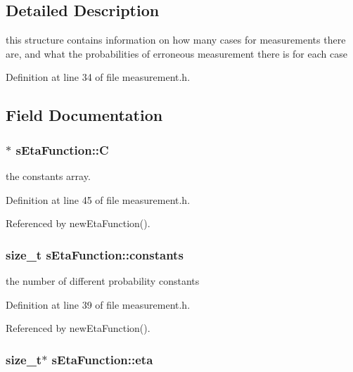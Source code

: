 \subsection{\-Detailed \-Description}
this structure contains information on how many cases for measurements there are, and what the probabilities of erroneous measurement there is for each case 

\-Definition at line 34 of file measurement.\-h.



\subsection{\-Field \-Documentation}
\hypertarget{structsEtaFunction_a05c2f93c1148d5268d359d78540c10be}{
\subsubsection[{\-C}]{$\ast$ {\bf s\-Eta\-Function\-::\-C}}}\label{structsEtaFunction_a05c2f93c1148d5268d359d78540c10be}


the constants array. 



\-Definition at line 45 of file measurement.\-h.



\-Referenced by new\-Eta\-Function().

\hypertarget{structsEtaFunction_a1fdf63f3a73e7fd663491e72421619f9}{
\subsubsection[{constants}]{\setlength{\rightskip}{0pt plus 5cm}size\-\_\-t {\bf s\-Eta\-Function\-::constants}}}\label{structsEtaFunction_a1fdf63f3a73e7fd663491e72421619f9}


the number of different probability constants 



\-Definition at line 39 of file measurement.\-h.



\-Referenced by new\-Eta\-Function().

\hypertarget{structsEtaFunction_a7585a59b1861523157055f8c8b0263e3}{
\subsubsection[{eta}]{\setlength{\rightskip}{0pt plus 5cm}size\-\_\-t$\ast$ {\bf s\-Eta\-Function\-::eta}}}\label{structsEtaFunction_a7585a59b1861523157055f8c8b0263e3}


